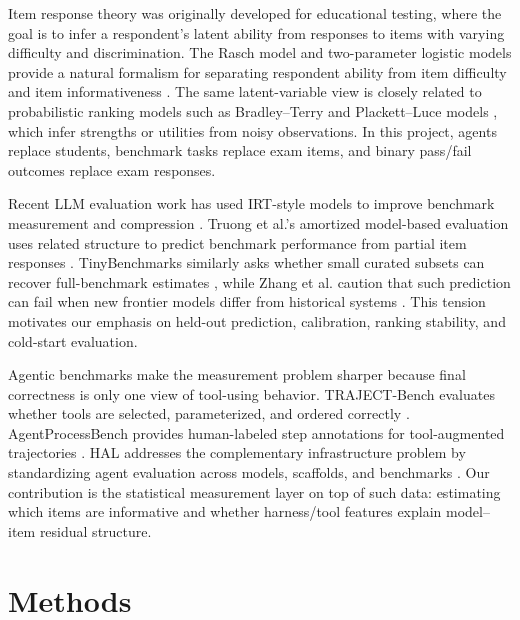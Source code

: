 \documentclass{article}
\begin{document}
Item response theory was originally developed for educational testing, where the goal is to infer a respondent's latent ability from responses to items with varying difficulty and discrimination. The Rasch model and two-parameter logistic models provide a natural formalism for separating respondent ability from item difficulty and item informativeness \citep{rasch1960probabilistic,baker2001basics}. The same latent-variable view is closely related to probabilistic ranking models such as Bradley--Terry and Plackett--Luce models \citep{bradley1952rank,luce1959individual}, which infer strengths or utilities from noisy observations. In this project, agents replace students, benchmark tasks replace exam items, and binary pass/fail outcomes replace exam responses.

Recent LLM evaluation work has used IRT-style models to improve benchmark measurement and compression \citep{lalor2016evaluation,zhou2025lost}. Truong et al.'s amortized model-based evaluation uses related structure to predict benchmark performance from partial item responses \citep{truong2025amortized}. TinyBenchmarks similarly asks whether small curated subsets can recover full-benchmark estimates \citep{maiapolo2024tinybenchmarks}, while Zhang et al. caution that such prediction can fail when new frontier models differ from historical systems \citep{zhang2025missesmark}. This tension motivates our emphasis on held-out prediction, calibration, ranking stability, and cold-start evaluation.

Agentic benchmarks make the measurement problem sharper because final correctness is only one view of tool-using behavior. TRAJECT-Bench evaluates whether tools are selected, parameterized, and ordered correctly \citep{he2025traject}. AgentProcessBench provides human-labeled step annotations for tool-augmented trajectories \citep{fan2026agentprocessbench}. HAL addresses the complementary infrastructure problem by standardizing agent evaluation across models, scaffolds, and benchmarks \citep{hal2026}. Our contribution is the statistical measurement layer on top of such data: estimating which items are informative and whether harness/tool features explain model--item residual structure.

\section{Methods}
\end{document}
